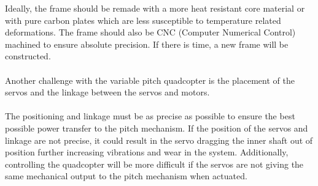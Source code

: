 Ideally, the frame should be remade with a more heat resistant core material or with pure carbon plates which are less susceptible to temperature related deformations. The frame should also be CNC (Computer Numerical Control) machined to ensure absolute precision. If there is time, a new frame will be constructed.\\
\\
Another challenge with the variable pitch quadcopter is the placement of the servos and the linkage between the servos and motors. \\
\\
The positioning and linkage must be as precise as possible to ensure the best possible power transfer to the pitch mechanism. If the position of the servos and linkage are not precise, it could result in the servo dragging the inner shaft out of position further increasing vibrations and wear in the system. Additionally, controlling the quadcopter will be more difficult if the servos are not giving the same mechanical output to the pitch mechanism when actuated.


\newpage


